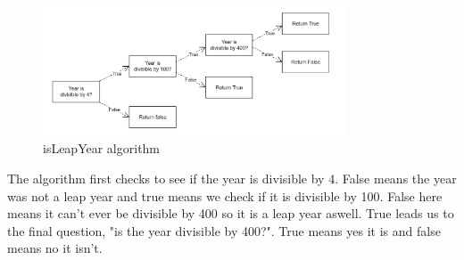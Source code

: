 \documentclass[12pt]{article}
\begin{document}
\maketitle
\begin{figure}[h]
    \centering
    \includegraphics[width=0.8\textwidth]{LaTeX/images/AlgorithmForLeapYear.PNG}
    \caption{isLeapYear algorithm}
\end{figure}
The algorithm first checks to see if the year is divisible by 4. False means the year was not a leap year and true means we check if it is divisible by 100. False here means it can't ever be divisible by 400 so it is a leap year aswell. True leads us to the final question, "is the year divisible by 400?". True means yes it is and false means no it isn't.
\end{document}
